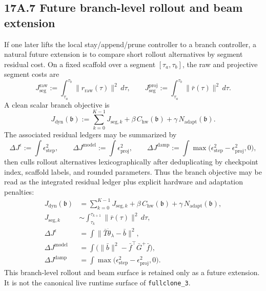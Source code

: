 \documentclass[11pt]{article}
\begin{document}
\subsection*{17A.7 Future branch-level rollout and beam extension}

If one later lifts the local stay/append/prune controller to a branch controller, a natural future extension is to compare short rollout alternatives by segment residual cost. On a fixed scaffold over a segment \([\tau_a,\tau_b]\), the raw and projective segment costs are
\[
J_{\mathrm{seg}}^{\mathrm{raw}}
:=
\int_{\tau_a}^{\tau_b}\|r_{\mathrm{raw}}(\tau)\|^2\,d\tau,
\qquad
J_{\mathrm{seg}}^{\mathrm{proj}}
:=
\int_{\tau_a}^{\tau_b}\|\bar r(\tau)\|^2\,d\tau.
\]
A clean scalar branch objective is
\[
J_{\mathrm{dyn}}(\mathfrak b)
:=
\sum_{k=0}^{K-1}J_{\mathrm{seg},k}
+\beta\,C_{\mathrm{hw}}(\mathfrak b)
+\gamma\,N_{\mathrm{adapt}}(\mathfrak b).
\]
The associated residual ledgers may be summarized by
\[
\Delta J^{\epsilon}
:=
\int \epsilon_{\mathrm{step}}^2,
\qquad
\Delta J^{\mathrm{model}}
:=
\int \epsilon_{\mathrm{proj}}^2,
\qquad
\Delta J^{\mathrm{damp}}
:=
\int \max\!\bigl(\epsilon_{\mathrm{step}}^2-\epsilon_{\mathrm{proj}}^2,0\bigr),
\]
then culls rollout alternatives lexicographically after deduplicating by checkpoint index, scaffold labels, and rounded parameters.
Thus the branch objective may be read as the integrated residual ledger plus explicit hardware and adaptation penalties:
\[
\begin{aligned}
J_{\mathrm{dyn}}(\mathfrak b)
&=
\sum_{k=0}^{K-1}J_{\mathrm{seg},k}
+\beta\,C_{\mathrm{hw}}(\mathfrak b)
+\gamma\,N_{\mathrm{adapt}}(\mathfrak b),\\
J_{\mathrm{seg},k}
&\sim
\int_{\tau_k}^{\tau_{k+1}}\|\bar r(\tau)\|^2\,d\tau,\\
\Delta J^{\epsilon}
&=
\int \|\bar T\dot\theta_\lambda-\bar b\|^2,\\
\Delta J^{\mathrm{model}}
&=
\int \bigl(\|\bar b\|^2-\bar f^\top\bar G^+\bar f\bigr),\\
\Delta J^{\mathrm{damp}}
&=
\int \max\!\bigl(\epsilon_{\mathrm{step}}^2-\epsilon_{\mathrm{proj}}^2,0\bigr).
\end{aligned}
\]
This branch-level rollout and beam surface is retained only as a future extension. It is not the canonical live runtime surface of \texttt{fullclone\_3}.
\medskip
\end{document}
